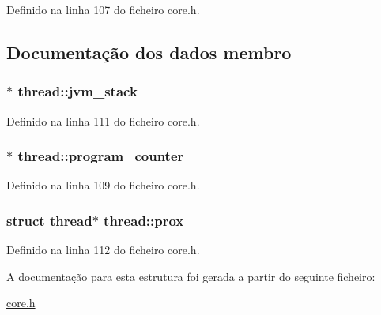 Definido na linha 107 do ficheiro core.\-h.



\subsection{Documentação dos dados membro}
\hypertarget{structthread_a45e1dff8e8c5d2981ee351857fbd765c}{
\subsubsection[{jvm\-\_\-stack}]{$\ast$ thread\-::jvm\-\_\-stack}}\label{structthread_a45e1dff8e8c5d2981ee351857fbd765c}


Definido na linha 111 do ficheiro core.\-h.

\hypertarget{structthread_ab5f04be4cab8242e674775d1538dfa43}{
\subsubsection[{program\-\_\-counter}]{$\ast$ thread\-::program\-\_\-counter}}\label{structthread_ab5f04be4cab8242e674775d1538dfa43}


Definido na linha 109 do ficheiro core.\-h.

\hypertarget{structthread_aa2c034fdf01f832556b8bf192ab57dcc}{
\subsubsection[{prox}]{\setlength{\rightskip}{0pt plus 5cm}struct {\bf thread}$\ast$ thread\-::prox}}\label{structthread_aa2c034fdf01f832556b8bf192ab57dcc}


Definido na linha 112 do ficheiro core.\-h.



A documentação para esta estrutura foi gerada a partir do seguinte ficheiro\-:\begin{DoxyCompactItemize}
\item 
\hyperlink{core_8h}{core.\-h}\end{DoxyCompactItemize}
